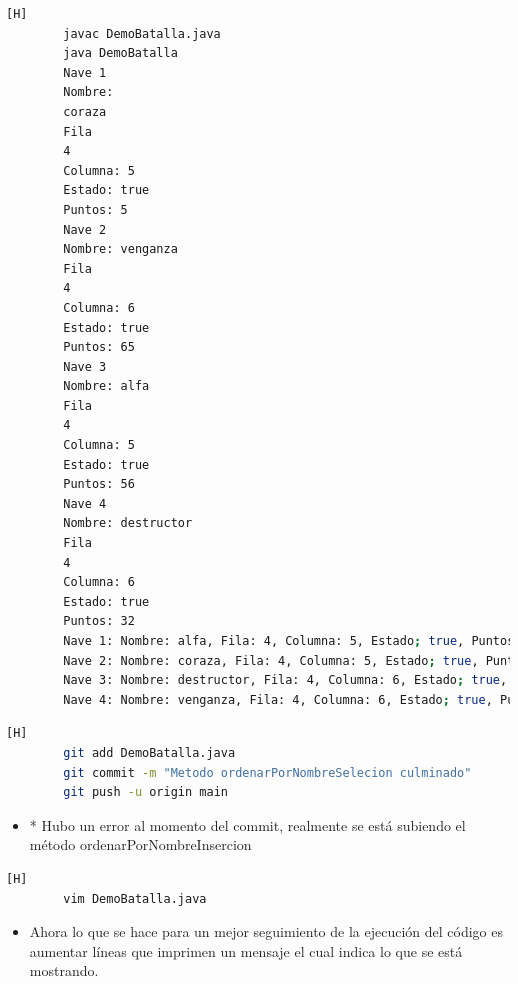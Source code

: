 \documentclass{article}
\begin{document}
	
	\begin{lstlisting}[language=bash,caption={Probando el metodo ordenarPorNombreInserción}][H]	
		javac DemoBatalla.java
		java DemoBatalla
		Nave 1
		Nombre:
		coraza
		Fila
		4
		Columna: 5
		Estado: true
		Puntos: 5
		Nave 2
		Nombre: venganza
		Fila
		4
		Columna: 6
		Estado: true
		Puntos: 65
		Nave 3
		Nombre: alfa
		Fila
		4
		Columna: 5
		Estado: true
		Puntos: 56
		Nave 4
		Nombre: destructor
		Fila
		4
		Columna: 6
		Estado: true
		Puntos: 32
		Nave 1: Nombre: alfa, Fila: 4, Columna: 5, Estado; true, Puntos: 56
		Nave 2: Nombre: coraza, Fila: 4, Columna: 5, Estado; true, Puntos: 5
		Nave 3: Nombre: destructor, Fila: 4, Columna: 6, Estado; true, Puntos: 32
		Nave 4: Nombre: venganza, Fila: 4, Columna: 6, Estado; true, Puntos: 65
	\end{lstlisting}
	\begin{lstlisting}[language=bash,caption={Commit: "Metodo ordenarPorNombreSelecion culminado" }][H]
		git add DemoBatalla.java
		git commit -m "Metodo ordenarPorNombreSelecion culminado"
		git push -u origin main
	\end{lstlisting}
	
	\begin{itemize}	
		\item * Hubo un error al momento del commit, realmente se está subiendo el método ordenarPorNombreInsercion
	\end{itemize}
	
	
	\begin{lstlisting}[language=bash,caption={Se borran los comenatrios y el numero de elementos del arreglo vuelve a ser de 10 para probarlo}][H]
		vim DemoBatalla.java
	\end{lstlisting}
	
	
	\begin{itemize}	
		\item Ahora lo que se hace para un mejor seguimiento de la ejecución del código es aumentar líneas que imprimen un mensaje el cual indica lo que se está mostrando.
	\end{itemize}
	
\end{document}
